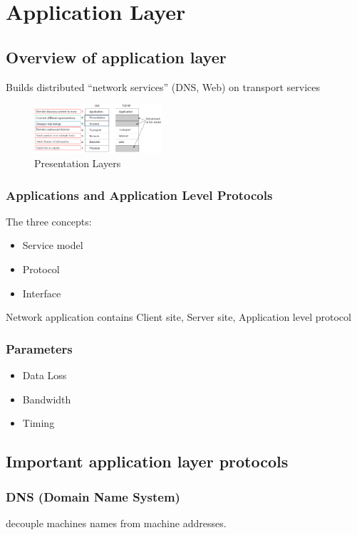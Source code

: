 \newpage
\section{Application Layer}
\subsection{Overview of application layer}
Builds distributed ``network services'' (DNS, Web) on transport services

\begin{figure}[!htb]
    \centering
    \includegraphics[width=0.42\textwidth]{pic/CN7/Presentation Layers}
    \caption{Presentation Layers}
\end{figure}

\subsubsection{Applications and Application Level Protocols}
The three concepts:
\begin{itemize}
    \item Service model
    \item Protocol
    \item Interface
\end{itemize}

Network application contains Client site, Server site, Application level protocol

\subsubsection{Parameters}
\begin{itemize}
    \item Data Loss
    \item Bandwidth
    \item Timing
\end{itemize}

\subsection{Important application layer protocols}

\subsubsection{DNS (Domain Name System)}
decouple machines names from machine addresses. 

